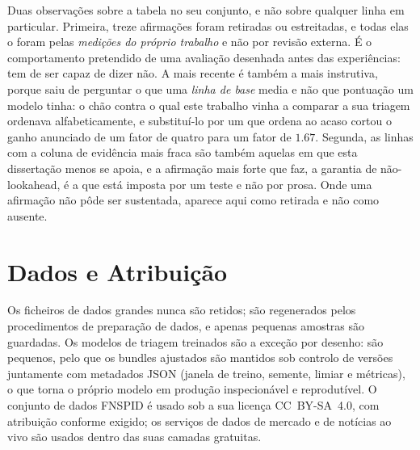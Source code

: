 Duas observações sobre a tabela no seu conjunto, e não sobre qualquer linha em particular. Primeira,
treze afirmações foram retiradas ou estreitadas, e todas elas o foram pelas \emph{medições do
próprio trabalho} e não por revisão externa. É o comportamento pretendido de uma avaliação desenhada
antes das experiências: tem de ser capaz de dizer não. A mais recente é também a mais instrutiva,
porque saiu de perguntar o que uma \emph{linha de base} media e não que pontuação um modelo tinha: o
chão contra o qual este trabalho vinha a comparar a sua triagem ordenava alfabeticamente, e substituí-lo
por um que ordena ao acaso cortou o ganho anunciado de um fator de quatro para um fator de $1.67$.
Segunda, as linhas com a coluna de evidência
mais fraca são também aquelas em que esta dissertação menos se apoia, e a afirmação mais forte que faz,
a garantia de não-lookahead, é a que está imposta por um teste e não por prosa. Onde uma afirmação não
pôde ser sustentada, aparece aqui como retirada e não como ausente.

\section{Dados e Atribuição}
\label{app:repro_data}

Os ficheiros de dados grandes nunca são retidos; são regenerados pelos procedimentos de preparação de
dados, e apenas pequenas amostras são guardadas. Os modelos de triagem treinados são a exceção por desenho: são pequenos,
pelo que os bundles ajustados são mantidos sob controlo de versões juntamente com metadados JSON (janela de
treino, semente, limiar e métricas), o que torna o próprio modelo em produção inspecionável e reprodutível.
O conjunto de dados FNSPID \autocite{dong2024fnspid} é usado sob a sua licença CC~BY-SA~4.0, com atribuição
conforme exigido; os serviços de dados de mercado e de notícias ao vivo são usados dentro das suas camadas
gratuitas.
